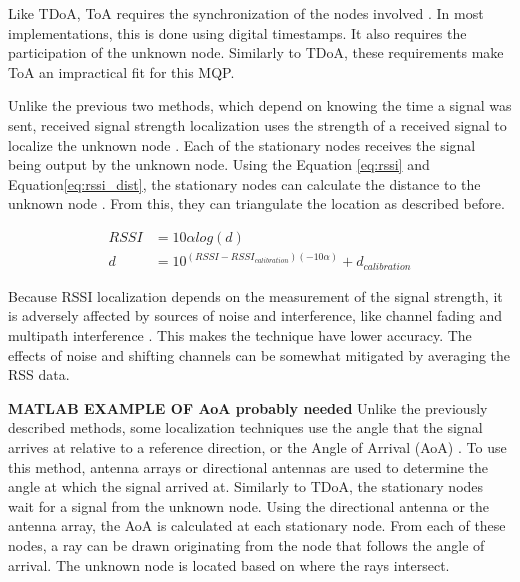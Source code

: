 Like TDoA, ToA requires the synchronization of the nodes involved \cite{local_conf}. In most implementations, this is done using digital timestamps. It also requires the participation of the unknown node. Similarly to TDoA, these requirements make ToA an impractical fit for this MQP. \par

Unlike the previous two methods, which depend on knowing the time a signal was sent, received signal strength localization uses the strength of a received signal to localize the unknown node \cite{local_conf}. Each of the stationary nodes receives the signal being output by the unknown node. Using the Equation \ref{eq:rssi} and Equation\ref{eq:rssi_dist}, the stationary nodes can calculate the distance to the unknown node \cite{rss_calc}. From this, they can triangulate the location as described before.\par
\begin{align}
\label{eq:rssi} RSSI &= 10\alpha log(d) \\ 
\label{eq:rssi_dist} d &= 10^{(RSSI-RSSI_{calibration})(-10\alpha)} + d_{calibration}
\end{align}
\par
Because RSSI localization depends on the measurement of the signal strength, it is adversely affected by sources of noise and interference, like channel fading and multipath interference \cite{local_conf}. This makes the technique have lower accuracy. The effects of noise and shifting channels can be somewhat mitigated by averaging the RSS data.

\textbf{MATLAB EXAMPLE OF AoA probably needed}
Unlike the previously described methods, some localization techniques use the angle that the signal arrives at relative to a reference direction, or the Angle of Arrival (AoA) \cite{local_aoa}. To use this method, antenna arrays or directional antennas are used to determine the angle at which the signal arrived at. Similarly to TDoA, the stationary nodes wait for a signal from the unknown node. Using the directional antenna or the antenna array, the AoA is calculated at each stationary node. From each of these nodes, a ray can be drawn originating from the node that follows the angle of arrival. The unknown node is located based on where the rays intersect.


